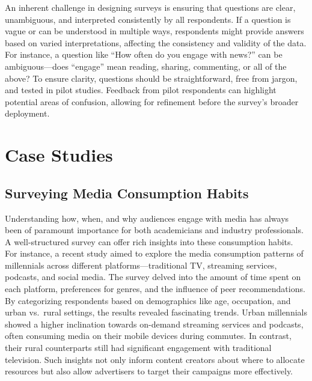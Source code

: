 \documentclass[
  b5paper]{book}
\begin{document}
An inherent challenge in designing surveys is ensuring that questions are clear, unambiguous, and interpreted consistently by all respondents. If a question is vague or can be understood in multiple ways, respondents might provide answers based on varied interpretations, affecting the consistency and validity of the data. For instance, a question like ``How often do you engage with news?'' can be ambiguous---does ``engage'' mean reading, sharing, commenting, or all of the above? To ensure clarity, questions should be straightforward, free from jargon, and tested in pilot studies. Feedback from pilot respondents can highlight potential areas of confusion, allowing for refinement before the survey's broader deployment.

\hypertarget{case-studies-4}{%
\section{Case Studies}\label{case-studies-4}}

\hypertarget{surveying-media-consumption-habits}{%
\subsection*{Surveying Media Consumption Habits}\label{surveying-media-consumption-habits}}

Understanding how, when, and why audiences engage with media has always been of paramount importance for both academicians and industry professionals. A well-structured survey can offer rich insights into these consumption habits. For instance, a recent study aimed to explore the media consumption patterns of millennials across different platforms---traditional TV, streaming services, podcasts, and social media. The survey delved into the amount of time spent on each platform, preferences for genres, and the influence of peer recommendations. By categorizing respondents based on demographics like age, occupation, and urban vs.~rural settings, the results revealed fascinating trends. Urban millennials showed a higher inclination towards on-demand streaming services and podcasts, often consuming media on their mobile devices during commutes. In contrast, their rural counterparts still had significant engagement with traditional television. Such insights not only inform content creators about where to allocate resources but also allow advertisers to target their campaigns more effectively.
\end{document}
